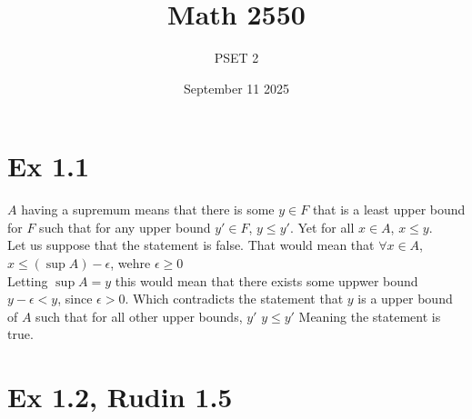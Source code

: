 \documentclass{report}
\title{\Huge{Math 2550}}
\author{\huge{PSET 2}}
\date{September 11 2025}
\begin{document}
\maketitle
\newpage%
\tableofcontents
\pagebreak

\section*{Ex 1.1}

\begin{proofWithHibiscus}
  $A$ having a supremum means that there is some $y \in F$ that is a least upper bound for 
  $F$ such that for any upper bound $y' \in F$, $y \leq y'$. Yet for all $x \in A$, $x \leq y$. \\
  Let us suppose that the statement is false. That would mean that $\forall x \in A$, $x \leq (\sup A) - \epsilon$, wehre $\epsilon \geq 0$ \\
  Letting $\sup A = y$ this would mean that there exists some uppwer bound $y - \epsilon < y$, since $\epsilon > 0$. 
  Which contradicts the statement that $y$ is a upper bound of $A$ such that for all other upper bounds, $y'$ $y \leq y'$ Meaning the statement is true. 
\end{proofWithHibiscus}


\section*{Ex 1.2, Rudin 1.5}

\end{document}
